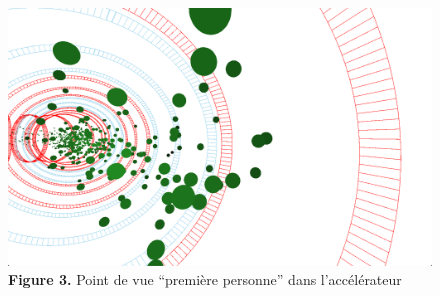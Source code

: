 \documentclass[12pt, letterpaper, twoside]{article}
\begin{document}
\begin{figure}[b!]
	\centering
	\includegraphics[width=7in]{images/firstperson.png}
	\caption{\textbf{Figure 3.} Point de vue ``première personne'' dans l'accélérateur}
\end{figure}
\end{document}
